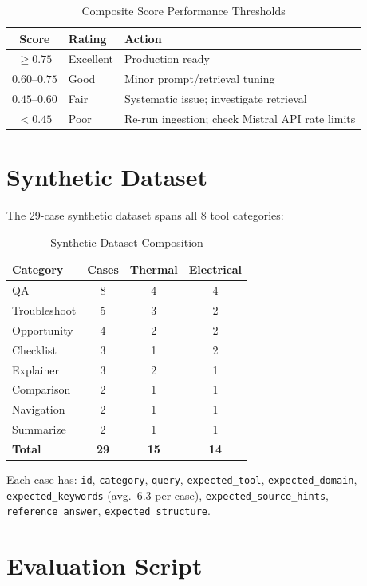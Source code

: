 \documentclass[12pt,a4paper]{report}
\begin{document}
\begin{table}[H]
\centering
\caption{Composite Score Performance Thresholds}
\begin{tabular}{@{}cll@{}}
\toprule
\textbf{Score} & \textbf{Rating} & \textbf{Action} \\
\midrule
$\geq 0.75$ & Excellent & Production ready \\
$0.60$--$0.75$ & Good & Minor prompt/retrieval tuning \\
$0.45$--$0.60$ & Fair & Systematic issue; investigate retrieval \\
$< 0.45$ & Poor & Re-run ingestion; check Mistral API rate limits \\
\bottomrule
\end{tabular}
\end{table}

\section{Synthetic Dataset}

The 29-case synthetic dataset spans all 8 tool categories:

\begin{table}[H]
\centering
\caption{Synthetic Dataset Composition}
\begin{tabular}{@{}lccc@{}}
\toprule
\textbf{Category} & \textbf{Cases} & \textbf{Thermal} & \textbf{Electrical} \\
\midrule
QA & 8 & 4 & 4 \\
Troubleshoot & 5 & 3 & 2 \\
Opportunity & 4 & 2 & 2 \\
Checklist & 3 & 1 & 2 \\
Explainer & 3 & 2 & 1 \\
Comparison & 2 & 1 & 1 \\
Navigation & 2 & 1 & 1 \\
Summarize & 2 & 1 & 1 \\
\midrule
\textbf{Total} & \textbf{29} & \textbf{15} & \textbf{14} \\
\bottomrule
\end{tabular}
\end{table}

Each case has: \texttt{id}, \texttt{category}, \texttt{query}, \texttt{expected\_tool}, \texttt{expected\_domain}, \texttt{expected\_keywords} (avg.\ 6.3 per case), \texttt{expected\_source\_hints}, \texttt{reference\_answer}, \texttt{expected\_structure}.

\section{Evaluation Script}
\end{document}
